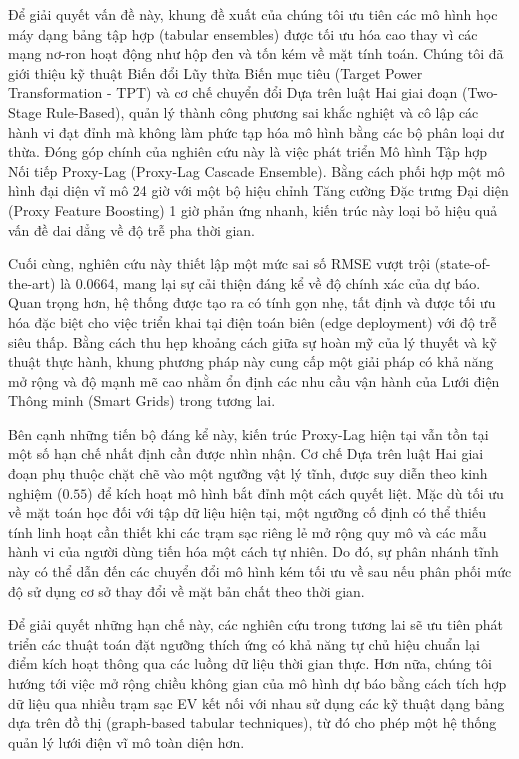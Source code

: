 \documentclass[pdflatex,sn-mathphys-num]{sn-jnl}%
\theoremstyle{thmstyleone}%
\theoremstyle{thmstyletwo}%
\theoremstyle{thmstylethree}%
\begin{document}
Để giải quyết vấn đề này, khung đề xuất của chúng tôi ưu tiên các mô hình học máy dạng bảng tập hợp (tabular ensembles) được tối ưu hóa cao thay vì các mạng nơ-ron hoạt động như hộp đen và tốn kém về mặt tính toán. Chúng tôi đã giới thiệu kỹ thuật Biến đổi Lũy thừa Biến mục tiêu (Target Power Transformation - TPT) và cơ chế chuyển đổi Dựa trên luật Hai giai đoạn (Two-Stage Rule-Based), quản lý thành công phương sai khắc nghiệt và cô lập các hành vi đạt đỉnh mà không làm phức tạp hóa mô hình bằng các bộ phân loại dư thừa. Đóng góp chính của nghiên cứu này là việc phát triển Mô hình Tập hợp Nối tiếp Proxy-Lag (Proxy-Lag Cascade Ensemble). Bằng cách phối hợp một mô hình đại diện vĩ mô 24 giờ với một bộ hiệu chỉnh Tăng cường Đặc trưng Đại diện (Proxy Feature Boosting) 1 giờ phản ứng nhanh, kiến trúc này loại bỏ hiệu quả vấn đề dai dẳng về độ trễ pha thời gian. 

Cuối cùng, nghiên cứu này thiết lập một mức sai số RMSE vượt trội (state-of-the-art) là 0.0664, mang lại sự cải thiện đáng kể về độ chính xác của dự báo. Quan trọng hơn, hệ thống được tạo ra có tính gọn nhẹ, tất định và được tối ưu hóa đặc biệt cho việc triển khai tại điện toán biên (edge deployment) với độ trễ siêu thấp. Bằng cách thu hẹp khoảng cách giữa sự hoàn mỹ của lý thuyết và kỹ thuật thực hành, khung phương pháp này cung cấp một giải pháp có khả năng mở rộng và độ mạnh mẽ cao nhằm ổn định các nhu cầu vận hành của Lưới điện Thông minh (Smart Grids) trong tương lai.

Bên cạnh những tiến bộ đáng kể này, kiến trúc Proxy-Lag hiện tại vẫn tồn tại một số hạn chế nhất định cần được nhìn nhận. Cơ chế Dựa trên luật Hai giai đoạn phụ thuộc chặt chẽ vào một ngưỡng vật lý tĩnh, được suy diễn theo kinh nghiệm ($0.55$) để kích hoạt mô hình bắt đỉnh một cách quyết liệt. Mặc dù tối ưu về mặt toán học đối với tập dữ liệu hiện tại, một ngưỡng cố định có thể thiếu tính linh hoạt cần thiết khi các trạm sạc riêng lẻ mở rộng quy mô và các mẫu hành vi của người dùng tiến hóa một cách tự nhiên. Do đó, sự phân nhánh tĩnh này có thể dẫn đến các chuyển đổi mô hình kém tối ưu về sau nếu phân phối mức độ sử dụng cơ sở thay đổi về mặt bản chất theo thời gian.

Để giải quyết những hạn chế này, các nghiên cứu trong tương lai sẽ ưu tiên phát triển các thuật toán đặt ngưỡng thích ứng có khả năng tự chủ hiệu chuẩn lại điểm kích hoạt thông qua các luồng dữ liệu thời gian thực. Hơn nữa, chúng tôi hướng tới việc mở rộng chiều không gian của mô hình dự báo bằng cách tích hợp dữ liệu qua nhiều trạm sạc EV kết nối với nhau sử dụng các kỹ thuật dạng bảng dựa trên đồ thị (graph-based tabular techniques), từ đó cho phép một hệ thống quản lý lưới điện vĩ mô toàn diện hơn.

\backmatter



\end{document}
